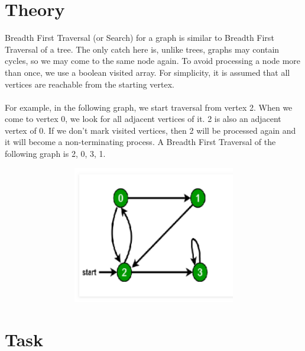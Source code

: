 \documentclass[11pt]{article}            %
\begin{document}
\section{Theory }              
\justify Breadth First Traversal (or Search) for a graph is similar to Breadth First Traversal of a tree. The only catch here is, unlike trees, graphs may contain cycles, so we may come to the same node again. To avoid processing a node more than once, we use a boolean visited array. For simplicity, it is assumed that all vertices are reachable from the starting vertex.\\~\\
For example, in the following graph, we start traversal from vertex 2. When we come to vertex 0, we look for all adjacent vertices of it. 2 is also an adjacent vertex of 0. If we don’t mark visited vertices, then 2 will be processed again and it will become a non-terminating process. A Breadth First Traversal of the following graph is 2, 0, 3, 1.
\begin{figure}[H]
\centering
  \includegraphics[width=12cm,height=6cm,keepaspectratio]{5.png}    
\end{figure}
\section{Task}  
\end{document}
